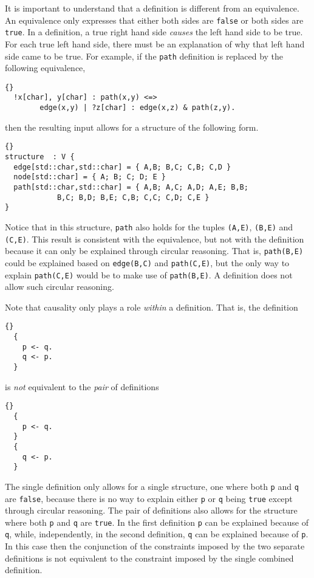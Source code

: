 \documentclass{article}
\begin{document}
It is important to understand that a definition is different from
an equivalence.  An equivalence only expresses that either both
sides are \texttt{false} or both sides are \texttt{true}.
In a definition, a true right hand side \emph{causes} the left hand side
to be true.  For each true left hand side, there must be an explanation
of why that left hand side came to be true.
For example, if the \texttt{path} definition is replaced by the following
equivalence,
\begin{lstlisting}{}
  !x[char], y[char] : path(x,y) <=>
        edge(x,y) | ?z[char] : edge(x,z) & path(z,y).
\end{lstlisting}
then the resulting input allows for a structure of the following
form.
\begin{lstlisting}{}
structure  : V {
  edge[std::char,std::char] = { A,B; B,C; C,B; C,D }
  node[std::char] = { A; B; C; D; E }
  path[std::char,std::char] = { A,B; A,C; A,D; A,E; B,B;
		    B,C; B,D; B,E; C,B; C,C; C,D; C,E }
}
\end{lstlisting}
Notice that in this structure, \texttt{path} also holds
for the tuples \texttt{(A,E)}, \texttt{(B,E)} and \texttt{(C,E)}.
This result is consistent with the equivalence, but not with the definition
because it can only be explained through circular reasoning.
That is, \texttt{path(B,E)} could be explained based on
\texttt{edge(B,C)} and \texttt{path(C,E)}, but the only way to explain
\texttt{path(C,E)} would be to make use of \texttt{path(B,E)}.
A definition does not allow such circular reasoning.

Note that causality only plays a role \emph{within} a definition.
That is, the definition
\begin{lstlisting}{}
  {
    p <- q.
    q <- p.
  }
\end{lstlisting}
is \emph{not} equivalent to the \emph{pair} of definitions
\begin{lstlisting}{}
  {
    p <- q.
  }
  {
    q <- p.
  }
\end{lstlisting}
The single definition only allows for a single structure,
one where both \texttt{p} and \texttt{q} are \texttt{false}, because
there is no way to explain either \texttt{p} or \texttt{q} being
\texttt{true} except through circular reasoning.
The pair of definitions also allows for the structure where
both \texttt{p} and \texttt{q} are \texttt{true}.
In the first definition \texttt{p} can be explained because of \texttt{q},
while, independently, in the second definition,
\texttt{q} can be explained because of \texttt{p}.
In this case then the conjunction of the constraints imposed
by the two separate definitions is not equivalent to the constraint
imposed by the single combined definition.
\end{document}
